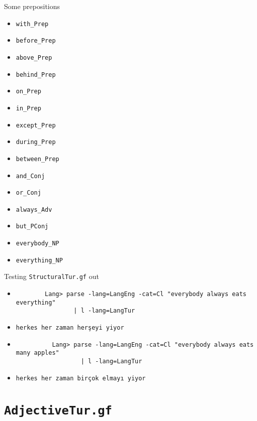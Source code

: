 \documentclass{beamer}
\newcommand{\translation}[1]{{\tiny\texttt{#1}}}
\begin{document}
  \begin{frame}{Some prepositions}
    \scriptsize
    \begin{itemize}
      \item \texttt{with\_Prep}
      \item \texttt{before\_Prep}
      \item \texttt{above\_Prep}
      \item \texttt{behind\_Prep}
      \item \texttt{on\_Prep}
      \item \texttt{in\_Prep}
      \item \texttt{except\_Prep}
      \item \texttt{during\_Prep}
      \item \texttt{between\_Prep}
      \item \texttt{and\_Conj}
      \item \texttt{or\_Conj}
      \item \texttt{always\_Adv}
      \item \texttt{but\_PConj}
      \item \texttt{everybody\_NP}
      \item \texttt{everything\_NP}
    \end{itemize}
    \normalsize
  \end{frame}

  \begin{frame}[fragile]{Testing \texttt{StructuralTur.gf} out}
    \begin{itemize}
      \item<1->
        \begin{lstlisting}
        Lang> parse -lang=LangEng -cat=Cl "everybody always eats everything"
                | l -lang=LangTur
        \end{lstlisting}
      \item<2->
        \begin{itemize}
          \translation{herkes her zaman her\c{s}eyi yiyor}
        \end{itemize}
      \item<3->
        \begin{lstlisting}
          Lang> parse -lang=LangEng -cat=Cl "everybody always eats many apples"
                  | l -lang=LangTur
        \end{lstlisting}
      \item<4->
        \begin{itemize}
            \translation{herkes her zaman bir\c{c}ok elmay\i\ yiyor}
        \end{itemize}
    \end{itemize}
  \end{frame}

  \section{\texttt{AdjectiveTur.gf}}

  \begin{frame}
  \end{frame}

\end{document}
